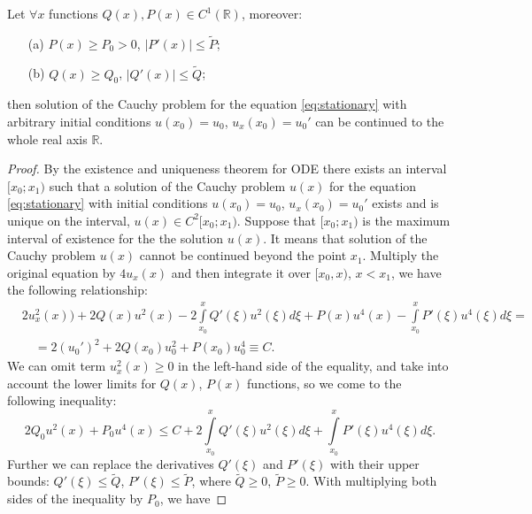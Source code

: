 \begin{proposition}
	Let $\forall x$ functions $Q(x), P(x) \in C^1(\mathbb{R})$, moreover:
	\begin{enumerate}
		\item[(a)] $P(x) \ge P_0 > 0$, $|P'(x)| \le \widetilde{P}$;
		\item[(b)] $Q(x) \ge Q_0$, $|Q'(x)| \le \widetilde{Q}$;
	\end{enumerate}
	then  solution of the Cauchy problem for the equation \eqref{eq:stationary} with arbitrary initial conditions $u(x_0) = u_0$, $u_{x}(x_0) = u_0'$ can be continued to the whole real axis $\mathbb{R}$. 
	\label{prop:absense-of-singular-solutions}
\end{proposition}
\begin{proof}
	By the existence and uniqueness theorem for ODE there exists an interval $[x_0; x_1)$ such that a solution of the Cauchy problem $u(x)$ for the equation \eqref{eq:stationary} with initial conditions $u(x_0) = u_0$, $u_{x}(x_0) = u_0'$ exists and is unique on the interval, $u(x) \in C^2[x_0; x_1)$.
	Suppose that $[x_0; x_1)$ is the maximum interval of existence for the the solution $u(x)$.
	It means that solution of the Cauchy problem $u(x)$ cannot be continued beyond the point $x_1$.
	Multiply the original equation by $4u_{x}(x)$ and then integrate it over $[x_0, x)$, $x < x_1$, we have the following relationship:
	\begin{equation}
	\begin{aligned}
		& 2 u_x^2(x)) + 2 Q(x) u^2(x) - 2 \int \limits_{x_0}^{x} Q'(\xi) u^2(\xi) d\xi + P(x) u^4(x) - \int \limits_{x_0}^x P'(\xi) u^4(\xi) d\xi = \\
		& \quad = 2 (u_0')^2 + 2 Q(x_0) u_0^2 + P(x_0) u_0^4 \equiv C.
		\label{eq:aux-04}
	\end{aligned}	
	\end{equation}
	We can omit term $u_{x}^2(x) \ge 0$ in the left-hand side of the equality, and take into account the lower limits for $Q(x)$, $P(x)$ functions, so we come to the following inequality:
	\begin{equation}
		2 Q_0 u^2(x) + P_0 u^4(x) \le C + 2 \int \limits_{x_0}^{x} Q'(\xi) u^2(\xi) d\xi + \int \limits_{x_0}^{x} P'(\xi) u^4(\xi) d\xi.
	\end{equation}
	Further we can replace the derivatives $Q'(\xi)$ and $P'(\xi)$ with their upper bounds: $Q'(\xi) \le \widetilde{Q}$, $P'(\xi) \le \widetilde{P}$, where $\widetilde{Q} \ge 0$, $\widetilde{P} \ge 0$.
	With multiplying both sides of the inequality by $P_0$, we have

\end{proof}
